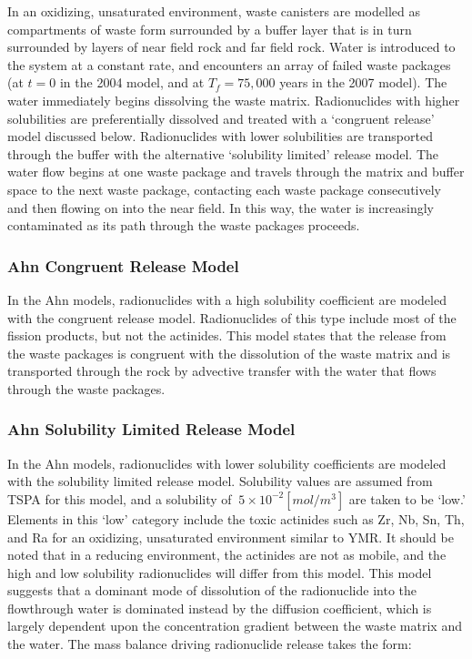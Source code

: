 In an oxidizing, unsaturated environment, waste canisters are modelled as 
compartments of waste form surrounded by a
buffer layer that is in turn surrounded by layers of near field rock and far
field rock. Water is introduced to the system at a constant rate, and
encounters an array of failed waste packages (at $t=0$ in the 2004 model, and
at $T_f=75,000$ years in the 2007 model). The water immediately begins
dissolving the waste matrix.  Radionuclides with higher solubilities are
preferentially dissolved and treated with a `congruent release' model discussed
below. Radionuclides with lower solubilities are transported through the buffer with
the alternative `solubility limited' release model. The water flow begins at
one waste package and travels through the matrix and buffer space to the next
waste package, contacting each waste package consecutively and then flowing on
into the near field. In this way, the water is increasingly contaminated as its
path through the waste packages proceeds.  

\subsubsection{Ahn Congruent Release Model} 

In the Ahn models, radionuclides with a high solubility coefficient are modeled with
the congruent release model.  Radionuclides of this type include most of the fission
products, but not the actinides. This model states that the release from the
waste packages is congruent with the dissolution of the waste matrix and is
transported through the rock by advective transfer with the water that flows
through the waste packages.  

\subsubsection{Ahn Solubility Limited Release Model}

In the Ahn models, radionuclides with lower solubility coefficients are modeled with
the solubility limited release model.  Solubility values are assumed from TSPA
for this model, and a solubility of $~5\times 10^{-2} [mol/m^3]$ are taken to be
`low.' Elements in this `low' category include the toxic actinides such as Zr,
Nb, Sn, Th, and Ra for an oxidizing, unsaturated environment similar to \gls{YMR}.
It should be noted that in a reducing environment, the actinides are not as mobile, 
and the high and low solubility radionuclides will differ from this model.
This model suggests that a dominant mode of dissolution of
the radionuclide into the flowthrough water is dominated instead by the diffusion
coefficient, which is largely dependent upon the concentration gradient between
the waste matrix and the water. The mass balance driving radionuclide release takes
the form:

